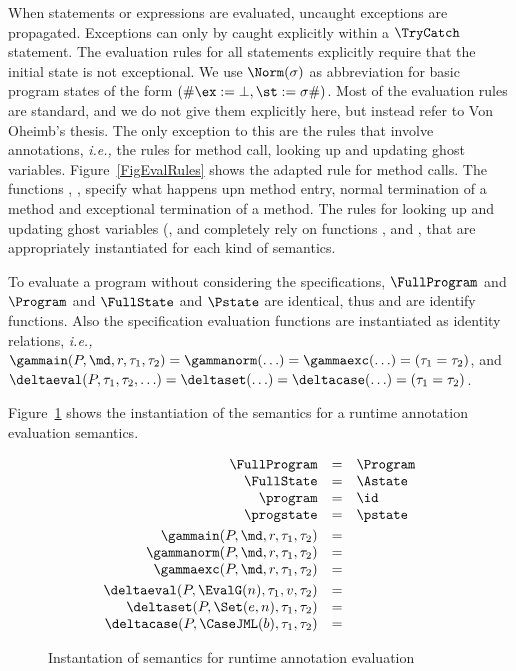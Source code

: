 When statements or expressions are evaluated, uncaught exceptions are
propagated. Exceptions can only by caught explicitly within a
\(\TryCatch\) statement. The evaluation rules for all statements
explicitly require that the initial state is not exceptional. We use
\(\Norm(\sigma)\) as abbreviation for basic program states of the form
\((\# \ex :=  \bot, \st := \sigma \#)\). Most of the evaluation rules
are standard, and we do not give them explicitly here, but instead
refer to Von Oheimb's thesis. The only exception to this are the rules
that involve annotations, \emph{i.e.,} the rules for method call,
looking up and updating ghost variables. Figure~\ref{FigEvalRules}
shows the adapted rule for method calls. The functions \gammain, \gammanorm,
\gammaexc specify what happens upn method entry, normal termination
of a method and exceptional termination of a method. The rules for
looking up and updating ghost variables (\EvalG, \Set and \CaseJML
completely rely on functions \deltaeval, \deltaset and \deltacase,
that are appropriately instantiated for each kind of semantics.

To evaluate a program without
considering the specifications, 
\(\FullProgram\) and \(\Program\) and
\(\FullState\) and \(\Pstate\) are identical, thus \program and
\progstate are identify functions. Also the specification evaluation
functions are instantiated as identity relations, \emph{i.e.,}
\(\gammain(P, \md, r, \tau_1, \tau_2) = \gammanorm(\ldots) = \gammaexc(\ldots) = (\tau_1 = \tau_2)\), and \(\deltaeval(P, \tau_1,
\tau_2, \ldots) = \deltaset(\ldots) = \deltacase(\ldots) = (\tau_1 =
\tau_2)\). 

Figure~\ref{FigAnnotatedSem} shows the instantiation of the semantics
for a runtime annotation evaluation semantics.

\begin{figure}[t]
\[
\begin{array}{rcl}
\FullProgram & = & \Program\\
\FullState & = & \Astate\\
\program & = & \id\\
\progstate & = & \pstate\smallskip\\

\gammain(P, \md, r, \tau_1, \tau_2) & = & \\
\gammanorm(P, \md, r, \tau_1, \tau_2) & = & \\
\gammaexc(P, \md, r, \tau_1, \tau_2) & = & \smallskip\\

\deltaeval(P, \EvalG(n), \tau_1, v, \tau_2) & = & \\
\deltaset(P, \Set(e, n), \tau_1, \tau_2) & = & \\
\deltacase(P, \CaseJML(b), \tau_1, \tau_2) & = & \\
\end{array}
\]
\caption{Instantation of semantics for runtime annotation evaluation}
\label{FigAnnotatedSem}
\end{figure}

